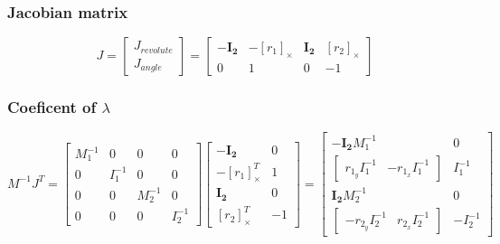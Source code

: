 \documentclass{article}
\begin{document}
	\subsubsection{Jacobian matrix}
		$$
		J=
		\begin{bmatrix}
			J_{revolute}\\
			J_{angle}
		\end{bmatrix}
		=
		\begin{bmatrix}
			-\boldsymbol{I_2}	& -[r_1]_\times	& \boldsymbol{I_2}	& [r_2]_\times\\
			0					& 1			 	& 0					& -1
		\end{bmatrix}
		$$
	\subsubsection{Coeficent of $\lambda$}
		$$
			M^{-1}J^T =
			\begin{bmatrix}
				M_1^{-1} 	& 0 		& 0 		& 0\\
				0 			& I_1^{-1} 	& 0 		& 0\\
				0 			& 0 		& M_2^{-1} 	& 0\\
				0 			& 0 		& 0 		& I_2^{-1}
			\end{bmatrix}
			\begin{bmatrix}
				-\boldsymbol{I_2}	&  0\\
				-[r_1]_\times^T		&  1\\
				\boldsymbol{I_2}	&  0\\
				[r_2]_\times^T 	& -1
			\end{bmatrix}
			=
			\begin{bmatrix}
				-\boldsymbol{I_2}M_1^{-1} & 0\\
				\begin{bmatrix}
					r_{1_y}I_1^{-1} & -r_{1_x}I_1^{-1}
				\end{bmatrix} 
				& I_1^{-1}\\
				\boldsymbol{I_2}M_2^{-1} & 0\\
				\begin{bmatrix}
					-r_{2_y}I_2^{-1} & r_{2_x}I_2^{-1}
				\end{bmatrix} 
				& -I_2^{-1}
			\end{bmatrix}
		$$
\end{document}
